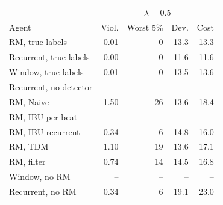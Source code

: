 \begin{tabular}{lrrrr}
\toprule
 & \multicolumn{4}{c}{$\lambda=0.5$} \\
Agent & Viol. & Worst 5\% & Dev. & Cost \\
\midrule
RM, true labels & 0.01 & 0 & 13.3 & 13.3 \\
Recurrent, true labels & 0.00 & 0 & 11.6 & 11.6 \\
Window, true labels & 0.01 & 0 & 13.5 & 13.6 \\
Recurrent, no detector & -- & -- & -- & -- \\
RM, Naive & 1.50 & 26 & 13.6 & 18.4 \\
RM, IBU per-beat & -- & -- & -- & -- \\
RM, IBU recurrent & 0.34 & 6 & 14.8 & 16.0 \\
RM, TDM & 1.10 & 19 & 13.6 & 17.1 \\
RM, filter & 0.74 & 14 & 14.5 & 16.8 \\
Window, no RM & -- & -- & -- & -- \\
Recurrent, no RM & 0.34 & 6 & 19.1 & 23.0 \\
\bottomrule
\end{tabular}

